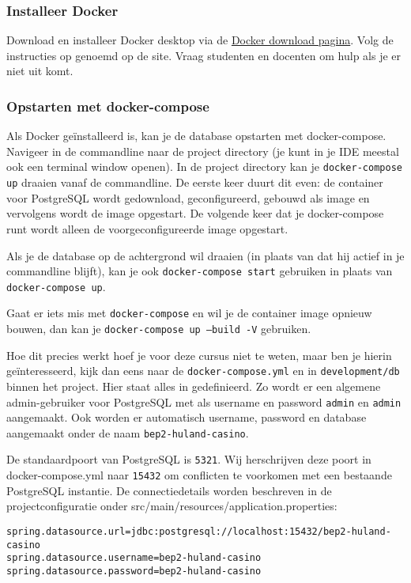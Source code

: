 \documentclass[dutch,a4paper,12pt,doubleside]{book}
\begin{document}
\subsubsection{Installeer Docker}
Download en installeer Docker desktop via de 
\href{https://www.docker.com/products/docker-desktop}{Docker download pagina}.
Volg de instructies op genoemd op de site.
Vraag studenten en docenten om hulp als je er niet uit komt.

\subsubsection{Opstarten met docker-compose}
Als Docker geïnstalleerd is, kan je de database opstarten met docker-compose.
Navigeer in de commandline naar de project directory (je kunt in je IDE meestal ook een terminal window openen).
In de project directory kan je \texttt{docker-compose up} draaien vanaf de commandline. 
De eerste keer duurt dit even: de container voor PostgreSQL wordt gedownload, geconfigureerd,
gebouwd als image en vervolgens wordt de image opgestart.
De volgende keer dat je docker-compose runt wordt alleen de voorgeconfigureerde image opgestart.

Als je de database op de achtergrond wil draaien (in plaats van dat hij actief in je commandline blijft),
kan je ook \texttt{docker-compose start} gebruiken in plaats van \texttt{docker-compose up}.

Gaat er iets mis met \texttt{docker-compose} en wil je de container image opnieuw bouwen,
dan kan je \texttt{docker-compose up --build -V} gebruiken.

Hoe dit precies werkt hoef je voor deze cursus niet te weten,
maar ben je hierin geïnteresseerd, kijk dan eens naar de \texttt{docker-compose.yml}
en in \texttt{development/db} binnen het project. Hier staat alles in gedefinieerd.
Zo wordt er een algemene admin-gebruiker voor PostgreSQL met als username en password 
\texttt{admin} en \texttt{admin} aangemaakt. Ook worden er automatisch username, password en database 
aangemaakt onder de naam \texttt{bep2-huland-casino}.

De standaardpoort van PostgreSQL is \texttt{5321}. Wij herschrijven deze poort in docker-compose.yml
naar \texttt{15432} om conflicten te voorkomen met een bestaande PostgreSQL instantie. 
De connectiedetails worden beschreven in de projectconfiguratie onder src/main/resources/application.properties:

\begin{verbatim}
spring.datasource.url=jdbc:postgresql://localhost:15432/bep2-huland-casino
spring.datasource.username=bep2-huland-casino
spring.datasource.password=bep2-huland-casino
\end{verbatim}
\end{document}
